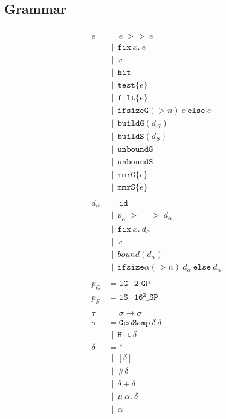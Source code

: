 \documentclass{article}
\newcommand {\gbar} {~~|~~}
\newcommand {\chain}{\mathtt{>>}}
\newcommand {\rightFish}{\mathtt{>=>}}
\newcommand {\fix}{\mathtt{fix}}
\newcommand {\test}{\mathtt{test}}
\newcommand {\filt}{\mathtt{filt}}
\newcommand {\isect}{\mathtt{hit}}
\newcommand {\buildG}{\mathtt{buildG}}
\newcommand {\buildS}{\mathtt{buildS}}
\newcommand {\unboundG}{\mathtt{unboundG}}
\newcommand {\unboundS}{\mathtt{unboundS}}
\newcommand {\mmrG}{\mathtt{mmrG}}
\newcommand {\mmrS}{\mathtt{mmrS}}
\newcommand {\oneS}{\mathtt{1S}}
\newcommand {\oneG}{\mathtt{1G}}
\newcommand {\sampP}{\mathtt{16^2\_SP}}
\newcommand {\twoGP}{\mathtt{2\_GP}}
\newcommand {\geosamp}{\mathtt{GeoSamp}}
\newcommand {\hit}{\mathtt{Hit}}
\newcommand {\bound}{\mathit{bound}}
\begin{document}
\subsection{Grammar}
\begin{align*}
\\
e &= e~\chain~e \\
&\gbar \fix~x.~e \\
&\gbar x \\
&\gbar \isect \\
&\gbar \test \{ e \} \\
&\gbar \filt \{ e \} \\
&\gbar \mathtt{ifsizeG}(>n)~e \mathtt{~else~} e \\
&\gbar \buildG ( d_G ) \\
&\gbar \buildS ( d_S ) \\
&\gbar \unboundG \\
&\gbar \unboundS \\
&\gbar \mmrG \{ e \} \\
&\gbar \mmrS \{ e \} \\
\\
d_\alpha &= \mathtt{id} \\
&\gbar p_\alpha~\rightFish~d_\alpha \\
&\gbar \fix~x.~d_\alpha \\
&\gbar x \\
&\gbar \bound (d_\alpha) \\
&\gbar \mathtt{ifsize\alpha}(>n)~d_\alpha \mathtt{~else~} d_\alpha \\
\\
p_G &= \oneG~|~\twoGP \\
p_S &= \oneS~|~\sampP \\
\\
\tau &= \sigma \to \sigma \\
\sigma &= \geosamp~\delta~\delta \\
&\gbar \hit~\delta \\
\delta &= * \\
&\gbar [\delta] \\
&\gbar \# \delta \\
&\gbar \delta + \delta \\
&\gbar \mu~\alpha.~\delta \\
&\gbar \alpha \\
\end{align*}
\end{document}
